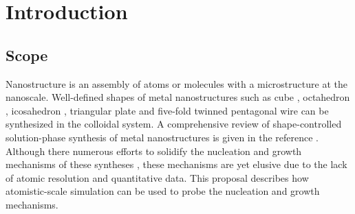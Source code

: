 \section{Introduction}

\subsection{Scope}

Nanostructure is an assembly of atoms or molecules with a microstructure at the nanoscale. Well-defined shapes of metal nanostructures such as cube \cite{Im_2005}, octahedron \cite{Xia_2012}, icosahedron \cite{Xiong_2007}, triangular plate \cite{Lofton_2005} and five-fold twinned pentagonal wire \cite{Tsuji_2008} can be synthesized in the colloidal system. A comprehensive review of shape-controlled solution-phase synthesis of metal nanostructures is given in the reference \cite{Xia_2008}. Although there numerous efforts to solidify the nucleation and growth mechanisms of these syntheses \cite{Lofton_2005,Mariscal_2012,Park_2013,Viswanath_2009,Liao_2014,Chang_2011,Murph_2015}, these mechanisms are yet elusive due to the lack of atomic resolution and quantitative data. This proposal describes how atomistic-scale simulation can be used to probe the nucleation and growth mechanisms.
